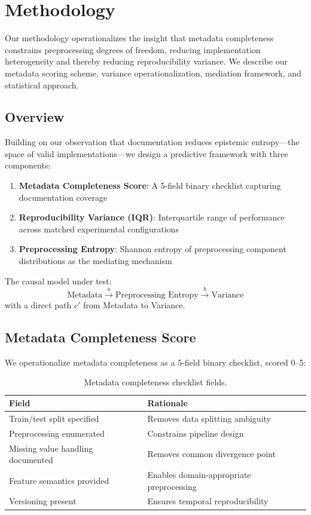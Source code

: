 \section{Methodology}
\label{sec:methodology}

Our methodology operationalizes the insight that metadata completeness constrains preprocessing degrees of freedom, reducing implementation heterogeneity and thereby reducing reproducibility variance. We describe our metadata scoring scheme, variance operationalization, mediation framework, and statistical approach.

\subsection{Overview}

Building on our observation that documentation reduces epistemic entropy---the space of valid implementations---we design a predictive framework with three components:

\begin{enumerate}
    \item \textbf{Metadata Completeness Score}: A 5-field binary checklist capturing documentation coverage
    \item \textbf{Reproducibility Variance (IQR)}: Interquartile range of performance across matched experimental configurations
    \item \textbf{Preprocessing Entropy}: Shannon entropy of preprocessing component distributions as the mediating mechanism
\end{enumerate}

The causal model under test:
\begin{equation}
\text{Metadata} \xrightarrow{a} \text{Preprocessing Entropy} \xrightarrow{b} \text{Variance}
\end{equation}
with a direct path $c'$ from Metadata to Variance.

\subsection{Metadata Completeness Score}

We operationalize metadata completeness as a 5-field binary checklist, scored 0--5:

\begin{table}[h]
\centering
\begin{tabular}{@{}lp{5cm}@{}}
\toprule
Field & Rationale \\
\midrule
Train/test split specified & Removes data splitting ambiguity \\
Preprocessing enumerated & Constrains pipeline design \\
Missing value handling documented & Removes common divergence point \\
Feature semantics provided & Enables domain-appropriate preprocessing \\
Versioning present & Ensures temporal reproducibility \\
\bottomrule
\end{tabular}
\caption{Metadata completeness checklist fields.}
\label{tab:checklist}
\end{table}


